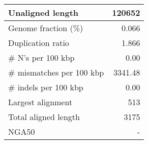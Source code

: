 \documentclass[12pt,a4paper]{article}
\begin{document}
\begin{table}[ht]
\begin{center}
\begin{tabular}{|l*{1}{|r}|}
Unaligned length & 120652 \\ \hline
Genome fraction (\%) & 0.066 \\ \hline
Duplication ratio & 1.866 \\ \hline
\# N's per 100 kbp & 0.00 \\ \hline
\# mismatches per 100 kbp & 3341.48 \\ \hline
\# indels per 100 kbp & 0.00 \\ \hline
Largest alignment & 513 \\ \hline
Total aligned length & 3175 \\ \hline
NGA50 & - \\ \hline
\end{tabular}
\end{center}
\end{table}
\end{document}

